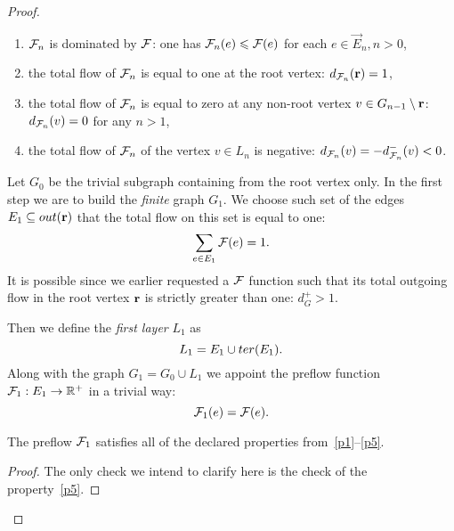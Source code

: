 \documentclass[12pt]{article}
\begin{document}
\begin{proof}
\begin{enumerate}[label=\textbf{P\arabic*}]
          \item \label{p2} $\mathcal{F}_{n}$ is dominated by $\mathcal{F}$: one has $\mathcal{F}_{n}(e) \leqslant \mathcal{F}(e)$ for each $e \in \vec{E}_n, n> 0$,
          \item \label{p3} the total flow of $\mathcal{F}_{n}$ is equal to one at the root vertex: $d_{\mathcal{F}_{n}}(\mathbf{r}) = 1$,
          \item \label{p4} the total flow of $\mathcal{F}_{n}$ is equal to zero at any non-root vertex $v \in G_{n-1}\setminus \mathbf{r}$: $d_{\mathcal{F}_{n}}(v) = 0$ for any $n > 1$,
          \item \label{p5} the total flow of $\mathcal{F}_{n}$ of the vertex $v \in L_n$ is negative: $d_{\mathcal{F}_{n}}(v) = -d^{-}_{\mathcal{F}_{n}}(v) < 0$.
        \end{enumerate}
      Let $G_0$ be the trivial subgraph containing from the root vertex only.
      In the first step we are to build the \emph{finite} graph $G_1$.
      We choose such set of the edges $E_1 \subseteq out(\mathbf{r})$ that the total flow on this set is equal to one:
      \[
        \sum_{e \in E_1} \mathcal{F}(e) = 1.
      \]
      It is possible since we earlier requested a $\mathcal{F}$ function such that its total outgoing flow in the root vertex
        $\mathbf{r}$ is strictly greater than one: $d^{+}_{G} > 1$.

      Then we define the \emph{first layer} $L_1$ as
      \[
        L_1 = E_1 \cup ter(E_1).
      \]
      Along with the graph $G_1 = G_0 \cup L_1$ we appoint the preflow function $\mathcal{F}_{1}: E_1 \to \mathbb{R}^{+}$ in a trivial way:
      \[
        \mathcal{F}_{1}(e) = \mathcal{F}(e).
      \]
      \begin{prop}
        The preflow $\mathcal{F}_{1}$ satisfies all of the declared properties from~\ref{p1}--\ref{p5}.
      \end{prop}
      \begin{proof}
        The only check we intend to clarify here is the check of the property~\ref{p5}.


\end{proof}
\end{proof}
\end{document}
